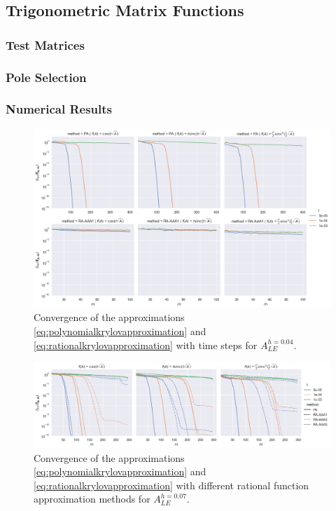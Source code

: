 \FloatBarrier
\subsection{Trigonometric Matrix Functions}
\subsubsection*{Test Matrices}
\subsubsection*{Pole Selection}
\subsubsection*{Numerical Results}

\begin{figure}[h]
    \centering
    \includegraphics[width=.9\textwidth]{img/trigonometric/cnvg_h4e-02_methods_PA:RA.png}
    \caption{
        Convergence of the approximations \eqref{eq:polynomialkrylovapproximation}
        and \eqref{eq:rationalkrylovapproximation} with time steps for $A_{LE}^{h=0.04}$.
        }
        \label{fig:trigonometricconvergencetimesteps}
\end{figure}

\begin{figure}[h]
        \centering
        \includegraphics[width=.9\textwidth]{img/trigonometric/cnvg_h7e-02_methods.png}
        \caption{
            Convergence of the approximations \eqref{eq:polynomialkrylovapproximation}
            and \eqref{eq:rationalkrylovapproximation} with different
            rational function approximation methods for $A_{LE}^{h=0.07}$.
        }
        \label{fig:trigonometricconvergencemethods}
\end{figure}
